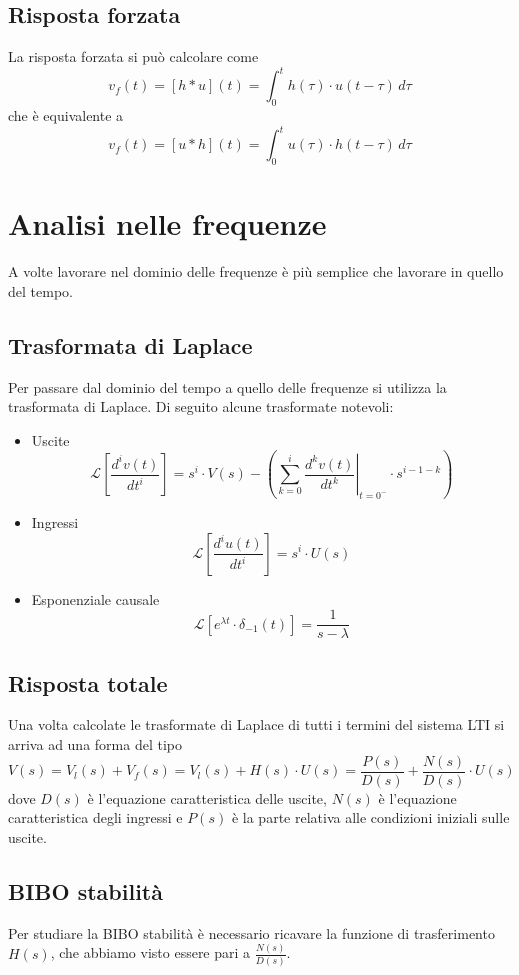 \documentclass[a4paper,oneside,titlepage]{book}
\begin{document}
\subsection{Risposta forzata}
La risposta forzata si può calcolare come
\[ v_f(t) = [h*u](t) = \int_{0}^t h(\tau) \cdot u(t-\tau)\,d\tau \]
che è equivalente a
\[ v_f(t) = [u*h](t) = \int_{0}^t u(\tau) \cdot h(t-\tau)\,d\tau \]


\section{Analisi nelle frequenze}
A volte lavorare nel dominio delle frequenze è più semplice che lavorare in quello del tempo.

\subsection{Trasformata di Laplace}
Per passare dal dominio del tempo a quello delle frequenze si utilizza la trasformata di Laplace. Di seguito alcune trasformate notevoli:
\begin{itemize}
\item Uscite
\[ \mathcal{L} \left[ \frac{d^{i} v(t)}{dt^{i}} \right] = s^i \cdot V(s) - \left( \sum_{k=0}^i \left. \frac{d^{k} v(t)}{dt^{k}} \right|_{t=0^-} \cdot s^{i-1-k} \right) \]

\item Ingressi
\[ \mathcal{L} \left[ \frac{d^{i} u(t)}{dt^{i}} \right] = s^i \cdot U(s) \]

\item Esponenziale causale
\[ \mathcal{L} \left[ e^{\lambda t} \cdot \delta_{-1}(t) \right] = \frac{1}{s - \lambda} \]
\end{itemize}

\subsection{Risposta totale}
Una volta calcolate le trasformate di Laplace di tutti i termini del sistema LTI si arriva ad una forma del tipo
\[ V(s) = V_l(s) + V_f(s) = V_l(s) + H(s) \cdot U(s) = \frac{P(s)}{D(s)} + \frac{N(s)}{D(s)} \cdot U(s) \]
dove $D(s)$ è l'equazione caratteristica delle uscite, $N(s)$ è l'equazione caratteristica degli ingressi e $P(s)$ è la parte relativa alle condizioni iniziali sulle uscite.

\subsection{BIBO stabilità}
Per studiare la BIBO stabilità è necessario ricavare la funzione di trasferimento $H(s)$, che abbiamo visto essere pari a $\frac{N(s)}{D(s)}$.
\end{document}
